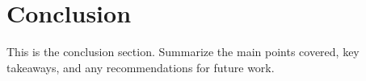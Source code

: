 \documentclass[12pt]{article}
\begin{document}
\section*{Conclusion}   %
This is the conclusion section.  
Summarize the main points covered, key takeaways, and any recommendations for future work.

\newpage
{}    %
\end{document}
